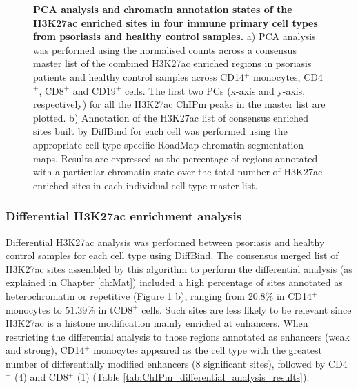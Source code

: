 \begin{figure}[htbp]
\begin{subfigure}[b]{0.6\textwidth}
\caption{}
\end{subfigure}
\caption[PCA analysis and chromatin annotation states of the H3K27ac enriched sites in four immune primary cell types from psoriasis and healthy control samples.]{\textbf{PCA analysis and chromatin annotation states of the H3K27ac enriched sites in four immune primary cell types from psoriasis and healthy control samples.} a) PCA analysis was performed using the normalised counts across a consensus master list of the combined H3K27ac enriched regions in psoriasis patients and healthy control samples across CD14$^+$ monocytes, CD4$^+$, CD8$^+$ and CD19$^+$ cells. The first two PCs (x-axis and y-axis, respectively) for all the H3K27ac ChIPm peaks in the master list are plotted. b) Annotation of the H3K27ac list of consensus enriched sites built by DiffBind for each cell was performed using the appropriate cell type specific RoadMap chromatin segmentation maps. Results are expressed as the percentage of regions annotated with a particular chromatin state over the total number of H3K27ac enriched sites in each individual cell type master list.}
\label{figure:ChIPm_PCA_and_chromatin_states}
\end{figure}


\subsubsection{Differential H3K27ac enrichment analysis}

Differential H3K27ac analysis was performed between psoriasis and healthy control samples for each cell type using DiffBind. The consensus merged list of H3K27ac sites assembled by this algorithm to perform the differential analysis (as explained in Chapter \ref{ch:Mat}) included a high percentage of sites annotated as heterochromatin or repetitive (Figure \ref{figure:ChIPm_PCA_and_chromatin_states} b), ranging from 20.8\% in CD14$^+$ monocytes to 51.39\% in tCD8$^+$ cells. Such sites are less likely to be relevant since H3K27ac is a histone modification mainly enriched at enhancers. When restricting the differential analysis to those regions annotated as enhancers (weak and strong), CD14$^+$ monocytes appeared as the cell type with the greatest number of differentially modified enhancers (8 significant sites), followed by CD4$^+$ (4) and CD8$^+$ (1) (Table \ref{tab:ChIPm_differential_analysis_results}).



